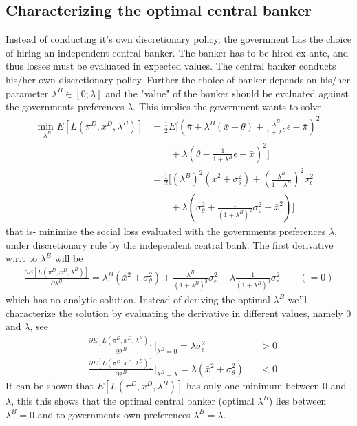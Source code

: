 \documentclass[12pt, a4paper]{article}
\begin{document}
\begin{spacing}{1.213}
\subsection{Characterizing the optimal central banker}
Instead of conducting it's own discretionary policy, the government has the choice of hiring an independent central banker. The banker has to be hired ex ante, and thus losses must be evaluated in expected values. The central banker conducts his/her own discretionary policy. Further the choice of banker depends on his/her parameter $\lambda^B \in [0;\lambda]$ and the "value" of the banker should be evaluated against the governments preferences $\lambda$. This implies the government wants to solve 
\begin{align*}
\underset{\lambda^B}{\textrm{min }} E[L(\pi^D, x^D, \lambda^B)] &= \frac{1}{2}E \bigg[ \left(
\bar{\pi} + \lambda^B(\bar{x}- \theta) + \frac{\lambda^B}{1+ \lambda^B} \epsilon - \bar{\pi} \right)^2 \\
& \qquad + \lambda \left( 
 \theta - \frac{1}{1+\lambda^B} \epsilon - \bar{x}
\right)^2
\bigg] \\
& = \frac{1}{2}\bigg[ (\lambda^B)^2(\bar{x}^2 + \sigma^2_{\theta}) + \left(\frac{\lambda^B}{1+ \lambda^B}\right)^2 \sigma^2_{\epsilon}  \\
& \qquad + \lambda \left(\sigma^2_{\theta} + \frac{1}{(1+\lambda^B )^2}\sigma^2_{\epsilon} + \bar{x}^2 \right) \bigg] 
\end{align*}
that is- minimize the social loss evaluated with the governments preferences $\lambda$, under discretionary rule by the independent central bank. The first derivative w.r.t to $\lambda^B$ will be 
\begin{align*}
\frac{\partial E[L(\pi^D, x^D, \lambda^B)]}{\partial \lambda^B} = \lambda^B(\bar{x}^2 + \sigma^2_{\theta}) + \frac{\lambda^B}{(1+\lambda^B)^3} \sigma^2_{\epsilon} - \lambda \frac{1}{(1+ \lambda^B)^3} \sigma^2_{\epsilon} \qquad (= 0)
\end{align*}
which has no analytic solution. Instead of deriving the optimal $\lambda^B$ we'll characterize the solution by evaluating the derivative in different values, namely $0$ and $\lambda$, see 
\begin{align*}
&\frac{\partial E[L(\pi^D, x^D, \lambda^B)]}{\partial \lambda^B} \bigg|_{\lambda^B = 0} = \lambda \sigma^2_{\epsilon} && >0 \\
& \frac{\partial E[L(\pi^D, x^D, \lambda^B)]}{\partial \lambda^B} \bigg|_{\lambda^B = \lambda} = \lambda(\bar{x}^2 + \sigma^2_{\theta}) && <0 
\end{align*}
It can be shown that $E[L(\pi^D, x^D, \lambda^B)]$ has only one minimum between $0$ and $\lambda$, this this shows that the optimal central banker (optimal $\lambda^B$) lies between $\lambda^B= 0$ and to governments own preferences $\lambda^B = \lambda$. 


\end{spacing}
\end{document}
